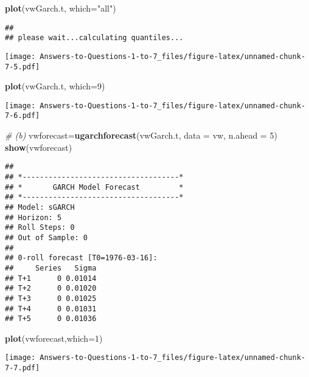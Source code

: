 \documentclass[
]{article}
\newenvironment{Shaded}{\begin{snugshade}}{\end{snugshade}}
\newcommand{\AttributeTok}[1]{\textcolor[rgb]{0.13,0.29,0.53}{#1}}
\newcommand{\CommentTok}[1]{\textcolor[rgb]{0.56,0.35,0.01}{\textit{#1}}}
\newcommand{\DecValTok}[1]{\textcolor[rgb]{0.00,0.00,0.81}{#1}}
\newcommand{\FunctionTok}[1]{\textcolor[rgb]{0.13,0.29,0.53}{\textbf{#1}}}
\newcommand{\NormalTok}[1]{#1}
\newcommand{\OtherTok}[1]{\textcolor[rgb]{0.56,0.35,0.01}{#1}}
\newcommand{\StringTok}[1]{\textcolor[rgb]{0.31,0.60,0.02}{#1}}
\begin{document}
\begin{Shaded}
\begin{Highlighting}[]
\FunctionTok{plot}\NormalTok{(vwGarch.t, }\AttributeTok{which=}\StringTok{"all"}\NormalTok{)}
\end{Highlighting}
\end{Shaded}

\begin{verbatim}
## 
## please wait...calculating quantiles...
\end{verbatim}

\texttt{[image: Answers-to-Questions-1-to-7\_files/figure-latex/unnamed-chunk-7-5.pdf]}

\begin{Shaded}
\begin{Highlighting}[]
\FunctionTok{plot}\NormalTok{(vwGarch.t, }\AttributeTok{which=}\DecValTok{9}\NormalTok{)}
\end{Highlighting}
\end{Shaded}

\texttt{[image: Answers-to-Questions-1-to-7\_files/figure-latex/unnamed-chunk-7-6.pdf]}

\begin{Shaded}
\begin{Highlighting}[]
\CommentTok{\# (b)}
\NormalTok{vwforecast}\OtherTok{=}\FunctionTok{ugarchforecast}\NormalTok{(vwGarch.t, }\AttributeTok{data =}\NormalTok{ vw, }\AttributeTok{n.ahead =} \DecValTok{5}\NormalTok{)}
\FunctionTok{show}\NormalTok{(vwforecast)}
\end{Highlighting}
\end{Shaded}

\begin{verbatim}
## 
## *------------------------------------*
## *       GARCH Model Forecast         *
## *------------------------------------*
## Model: sGARCH
## Horizon: 5
## Roll Steps: 0
## Out of Sample: 0
## 
## 0-roll forecast [T0=1976-03-16]:
##     Series   Sigma
## T+1      0 0.01014
## T+2      0 0.01020
## T+3      0 0.01025
## T+4      0 0.01031
## T+5      0 0.01036
\end{verbatim}

\begin{Shaded}
\begin{Highlighting}[]
\FunctionTok{plot}\NormalTok{(vwforecast,}\AttributeTok{which=}\DecValTok{1}\NormalTok{)}
\end{Highlighting}
\end{Shaded}

\texttt{[image: Answers-to-Questions-1-to-7\_files/figure-latex/unnamed-chunk-7-7.pdf]}
\end{document}
